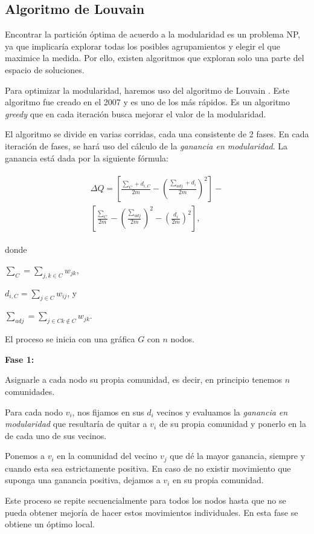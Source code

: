 \documentclass[conference]{IEEEtran}
\begin{document}
\subsection{Algoritmo de Louvain}

Encontrar la partición óptima de acuerdo a la modularidad es un problema NP, ya que implicaría explorar todas los posibles agrupamientos y elegir el que maximice la medida. Por ello, existen algoritmos que exploran solo una parte del espacio de soluciones. 

Para optimizar la modularidad, haremos uso del algoritmo de Louvain \cite{Blondel08fastunfolding}. Este algoritmo fue creado en el 2007 y es uno de los más rápidos. Es un algoritmo \textit{greedy} que en cada iteración busca mejorar el valor de la modularidad. 

El algoritmo se divide en varias corridas, cada una consistente de 2 fases. En cada iteración de fases, se hará uso del cálculo de la \textit{ganancia en modularidad}. La ganancia está dada por la siguiente fórmula:

\begin{align}
\begin{split}
    \Delta Q = \left[  \frac{ \sum_{C} +  d_{i,C} }{  2m  }  - \left( \frac{ \sum_{adj} +  d_{i} }{2m} \right)^2  \right] - \\
    \left[ \frac{ \sum_{C} }{2m}  -  \left( \frac{\sum_{adj} }{ 2m } \right)^2 - \left( \frac{ d_i }{ 2m } \right)^2 \right],
\end{split}
\end{align}

donde

$ \sum_{C} = \sum_{j,k \in C} w_{jk}$,

$ d_{i,C} = \sum_{j \in C} w_{ij}$, y

$  \sum_{adj} = \sum_{j\in C k \notin C} w_{jk}$.
 
\bigskip
El proceso se inicia con una gráfica $G$ con $n$ nodos.
\begin{compactenum}
\item[] \textbf{Fase 1:}
\item Asignarle a cada nodo su propia comunidad, es decir, en principio tenemos $n$ comunidades.
\item Para cada nodo $v_{i}$, nos fijamos en sus $d_{i}$ vecinos y evaluamos la \textit{ganancia en modularidad} que resultaría de quitar a $v_{i}$ de su propia comunidad y ponerlo en la de cada uno de sus vecinos. 
\item Ponemos a $v_{i}$ en la comunidad del vecino $v_{j}$ que dé la mayor ganancia, siempre y cuando esta sea estrictamente positiva. En caso de no existir movimiento que suponga una ganancia positiva, dejamos a $v_{i}$ en su propia comunidad.
\item Este proceso se repite secuencialmente para todos los nodos hasta que no se pueda obtener mejoría de hacer estos movimientos individuales. En esta fase se obtiene un óptimo local.
\end{compactenum}
\medskip 
\end{document}
